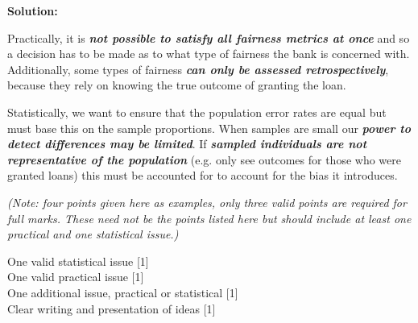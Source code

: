 \documentclass[a4paper, 11pt]{article}
\begin{document}
{\color{blue}
\textbf{Solution:}

Practically, it is \textbf{\textit{not possible to satisfy all fairness metrics at once}} and so a decision has to be made as to what type of fairness the bank is concerned with. Additionally, some types of fairness \textbf{\textit{can only be assessed retrospectively}}, because they rely on knowing the true outcome of granting the loan. 

Statistically, we want to ensure that the population error rates are equal but must base this on the sample proportions. When samples are small our \textbf{\textit{power to detect differences may be limited}}. If \textbf{\textit{sampled individuals are not representative of the population}} (e.g. only see outcomes for those who were granted loans) this must be accounted for to account for the bias it introduces. 

\textit{(Note: four points given here as examples, only three valid points are required for full marks. These need not be the points listed here but should include at least one practical and one statistical issue.)}

One valid  statistical issue [1] \\
One valid practical issue [1] \\
One additional issue, practical or statistical [1] \\
Clear writing and presentation of ideas [1] 
}
\end{document}
